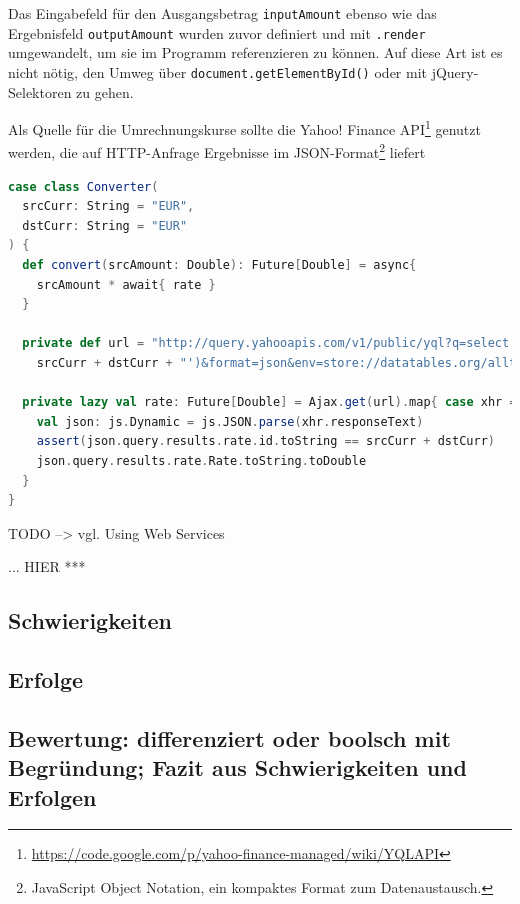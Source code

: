 \documentclass[a4paper, 12pt, hidelinks, listof=totoc, listoftables=totoc, bibliography=totoc]{scrreprt}
\begin{document}
Das Eingabefeld für den Ausgangsbetrag \texttt{inputAmount} ebenso wie das Ergebnisfeld \texttt{outputAmount} wurden zuvor definiert und mit \texttt{.render} umgewandelt, um sie im Programm referenzieren zu können. Auf diese Art ist es nicht nötig, den Umweg über \texttt{document.getElementById()} oder mit jQuery-Selektoren zu gehen.

Als Quelle für die Umrechnungskurse sollte die Yahoo! Finance API\footnote{
	\url{https://code.google.com/p/yahoo-finance-managed/wiki/YQLAPI}}
genutzt werden, die auf HTTP-Anfrage Ergebnisse im JSON-Format\footnote{
	JavaScript Object Notation, ein kompaktes Format zum Datenaustausch.}
liefert

\begin{lstlisting}[language=Scala]
case class Converter(
  srcCurr: String = "EUR",
  dstCurr: String = "EUR"
) {
  def convert(srcAmount: Double): Future[Double] = async{
    srcAmount * await{ rate }
  }

  private def url = "http://query.yahooapis.com/v1/public/yql?q=select * from yahoo.finance.xchange where pair in ('" +
    srcCurr + dstCurr + "')&format=json&env=store://datatables.org/alltableswithkeys"

  private lazy val rate: Future[Double] = Ajax.get(url).map{ case xhr =>
    val json: js.Dynamic = js.JSON.parse(xhr.responseText)
    assert(json.query.results.rate.id.toString == srcCurr + dstCurr)
    json.query.results.rate.Rate.toString.toDouble
  }
}
\end{lstlisting}

TODO  -->  vgl. Using Web Services \cite[\#UsingWebServices]{haoyi.HOS}

... HIER *** %



\subsection{Schwierigkeiten}




\subsection{Erfolge}
\subsection{Bewertung: differenziert oder boolsch mit Begründung; Fazit aus Schwierigkeiten und Erfolgen}

\end{document}

